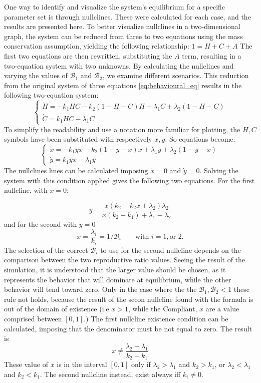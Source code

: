 One way to identify and visualize the system’s equilibrium for a specific parameter set is through nullclines. These were calculated for each case, and the results are presented here. To better visualize nullclines in a two-dimensional graph, the system can be reduced from three to two equations using the mass conservation assumption, yielding the following relationship: $1=H+C+A$ The first two equations are then rewritten, substituting the $A$ term, resulting in a two-equation system with two unknowns. By calculating the nullclines and varying the values of $\mathcal{B}_1$ and $\mathcal{B}_2$, we examine different scenarios. This reduction from the original system of three equations \ref{eq:behavioural_eq}  results in the following two-equation system: 
\[
\begin{cases}
	\dot{H} = -k_1 H C - k_2 (1-H-C) H + \lambda_1 C + \lambda_2 (1-H-C)\\
	\dot{C} = k_1 H C - \lambda_1 C
\end{cases}
\]
To simplify the readability and use a notation more familiar for plotting, the $H, C$ symbols have been substituted with respectively $x, y$. So equations become:
\begin{equation}
\label{eq:system_nullclines}
\begin{cases}
	\dot{x} = -k_1 y x - k_2 (1-y-x) x + \lambda_1 y + \lambda_2 (1-y-x)\\
	\dot{y} = k_1 y x - \lambda_1 y
\end{cases}
\end{equation}
The nullclines lines can be calculated imposing $\dot{x} = 0$ and $\dot{y} = 0$. Solving the system with this condition applied gives the following two equations. For the first nullcline, with $\dot{x} = 0$:

\begin{equation}
 y = \frac{x(k_2 - k_2 x + \lambda_2)  \lambda_2}{x(k_2 - k_1)+ \lambda_1- \lambda_2}
\end{equation}
and for the second with $\dot{y} = 0$
\[x = \frac{\lambda_i}{k_i} = 1/\mathcal{B}_i \qquad \text{with } i = 1, \text{or } 2.
\]
The selection of the correct $\mathcal{B}_i$ to use for the second nullcline depends on
the comparison between the two reproductive ratio values. Seeing the result of the simulation, it is understood that the larger value should be chosen, as it represents the behavior that will dominate at equilibrium, while the other behavior will tend toward zero. Only in the case where the the $\mathcal{B}_1, \mathcal{B}_2 < 1$ these rule not holds, because the result of the secon nullcline found with the formula is out of the domain of existence (i.e $x > 1$, while the Compliant, $x$ are a value comprised between $[0,1]$.)
The first nullcline existence condition can be calculated, imposing that the denominator must be not equal to zero. The result is
\[ x \neq \frac{\lambda_2-\lambda_1}{k_2 - k_1} \]
These value of $x$ is in the interval $[0,1]$ only if $\lambda_2>\lambda_1$ and $k_2 > k_1$, or $\lambda_2<\lambda_1$ and $k_2 < k_1$. The second nullcline instead, exist always iff $k_i \neq 0$.


